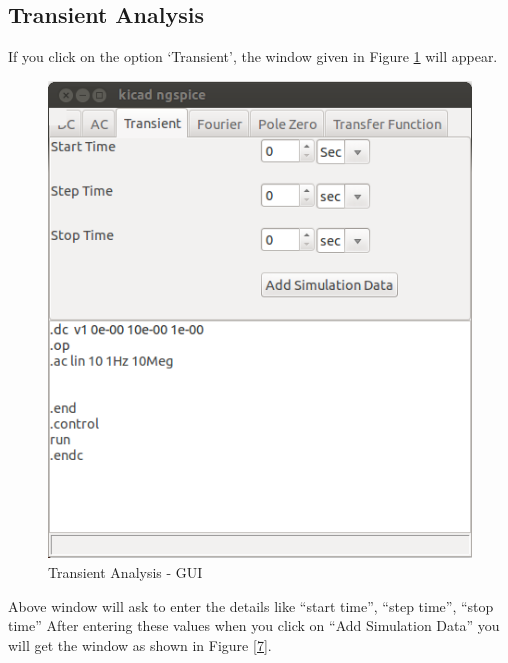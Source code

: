 \subsection{Transient Analysis}
If you click on the option `Transient', the window given in Figure \ref{6} will appear.
\begin{figure}
\centering
\includegraphics[width=\textwidth]{figures/6}
\caption{Transient Analysis - GUI}
\label{6}
\end{figure}
Above window will ask to enter the details like “start time”, “step time”, “stop time”
After entering these values when you click on “Add Simulation Data” you will get the window as shown in Figure \ref{7}.
